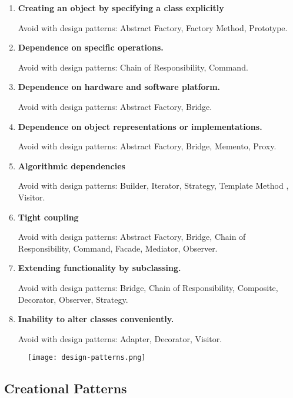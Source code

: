 \documentclass{article}
\begin{document}
\begin{enumerate}
    \item \textbf{Creating an object by specifying a class explicitly}
    
    Avoid with design patterns: Abstract Factory, Factory Method, Prototype. 
    
    \item \textbf{Dependence on specific operations.}
    
    Avoid with design patterns: Chain of Responsibility, Command.
    
    \item \textbf{Dependence on hardware and software platform.}
    
    Avoid with design patterns: Abstract Factory, Bridge.
    
    \item \textbf{Dependence on object representations or implementations.}
    
    Avoid with design patterns: Abstract Factory, Bridge, Memento, Proxy.
    
    \item \textbf{Algorithmic dependencies}
    
    Avoid with design patterns: Builder, Iterator, Strategy, Template Method , Visitor.
    
    \item \textbf{Tight coupling}
    
    Avoid with design patterns: Abstract Factory, Bridge, Chain of Responsibility, Command, Facade, Mediator, Observer.
    
    
    \item \textbf{Extending functionality by subclassing.}
    
    Avoid with design patterns: Bridge, Chain of Responsibility, Composite,  Decorator, Observer, Strategy.
    
    \item \textbf{Inability to alter classes conveniently.}
    
    Avoid with design patterns: Adapter, Decorator, Visitor.
\end{enumerate}

\begin{figure}
    \centering
    \texttt{[image: design-patterns.png]}
\end{figure}

\newpage
\subsection{Creational Patterns}
\end{document}

